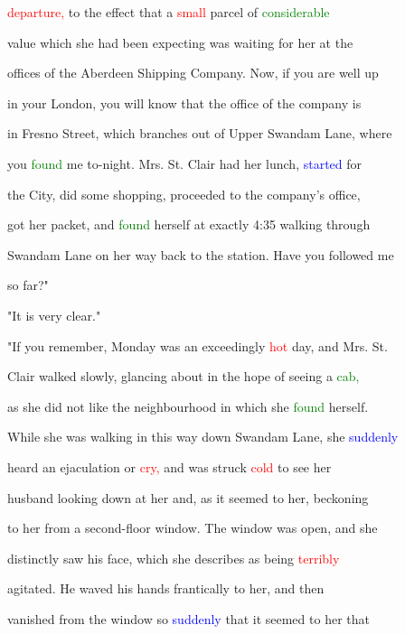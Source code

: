  \textcolor{red}{departure,} to the effect that a \textcolor{red}{small} parcel of \textcolor{green}{considerable}

 value which she had been \textcolor{BurntOrange}{expecting} was \textcolor{BurntOrange}{waiting} for her at the

 offices of the Aberdeen Shipping Company. Now, if you are well up

 in your London, you will know that the office of the company is

 in Fresno Street, which branches out of Upper Swandam Lane, where

 you \textcolor{green}{found} me to-night. Mrs. St. Clair had her lunch, \textcolor{blue}{started} for

 the City, did some \textcolor{BurntOrange}{shopping,} proceeded to the company's office,

 got her packet, and \textcolor{green}{found} herself at exactly 4:35 walking through

 Swandam Lane on her way back to the station. Have you followed me

 so far?"



 "It is very clear."



 "If you remember, Monday was an exceedingly \textcolor{red}{hot} day, and Mrs. St.

 Clair walked slowly, glancing about in the \textcolor{BurntOrange}{hope} of seeing a \textcolor{green}{cab,}

 as she did not like the neighbourhood in which she \textcolor{green}{found} herself.

 While she was walking in this way down Swandam Lane, she \textcolor{blue}{suddenly}

 heard an \textcolor{BurntOrange}{ejaculation} or \textcolor{red}{cry,} and was struck \textcolor{red}{cold} to see her

 husband looking down at her and, as it seemed to her, beckoning

 to her from a second-floor window. The window was open, and she

 distinctly saw his face, which she describes as being \textcolor{red}{terribly}

 agitated. He waved his hands frantically to her, and then

 \textcolor{BurntOrange}{vanished} from the window so \textcolor{blue}{suddenly} that it seemed to her that

